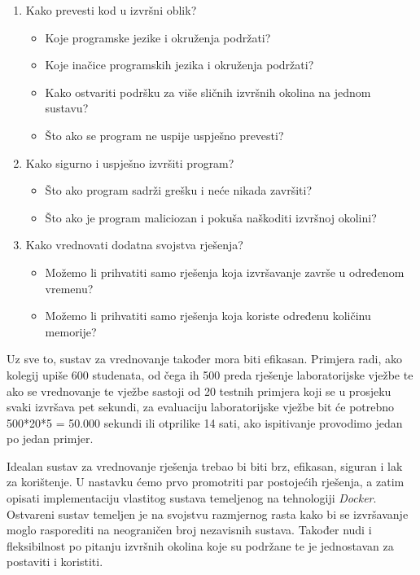 \documentclass[times, utf8, zavrsni]{fer}
\begin{document}
\begin{enumerate}
\item Kako prevesti kod u izvršni oblik?
	\begin{itemize}
	\item Koje programske jezike i okruženja podržati?
	\item Koje inačice programskih jezika i okruženja podržati?
	\item Kako ostvariti podršku za više sličnih izvršnih okolina na jednom sustavu?
	\item Što ako se program ne uspije uspješno prevesti?
	\end{itemize}
\item Kako sigurno i uspješno izvršiti program?
	\begin{itemize}
	\item Što ako program sadrži grešku i neće nikada završiti?
	\item Što ako je program maliciozan i pokuša naškoditi izvršnoj okolini?
	\end{itemize}
\item Kako vrednovati dodatna svojstva rješenja?
	\begin{itemize}
	\item Možemo li prihvatiti samo rješenja koja izvršavanje završe u određenom vremenu?
	\item Možemo li prihvatiti samo rješenja koja koriste određenu količinu memorije?
	\end{itemize}
\end{enumerate}

Uz sve to, sustav za vrednovanje također mora biti efikasan. Primjera radi, ako kolegij upiše 600 studenata, od čega ih 500 preda rješenje laboratorijske vježbe te ako se vrednovanje te vježbe sastoji od 20 testnih primjera koji se u prosjeku svaki izvršava pet sekundi, za evaluaciju laboratorijske vježbe bit će potrebno 500*20*5 = 50.000 sekundi ili otprilike 14 sati, ako ispitivanje provodimo jedan po jedan primjer.

Idealan sustav za vrednovanje rješenja trebao bi biti brz, efikasan, siguran i lak za korištenje. U nastavku ćemo prvo promotriti par postojećih rješenja, a zatim opisati implementaciju vlastitog sustava temeljenog na tehnologiji {\textit{Docker}}. Ostvareni sustav temeljen je na svojstvu razmjernog rasta kako bi se izvršavanje moglo rasporediti na neograničen broj nezavisnih sustava. Također nudi i fleksibilnost po pitanju izvršnih okolina koje su podržane te je jednostavan za postaviti i koristiti.
\end{document}

